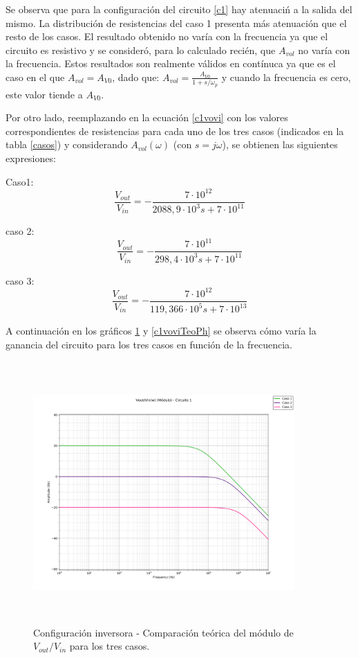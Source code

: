 Se observa que para la configuraci\'on del circuito \ref{c1} hay atenuaci\'n
a la salida del mismo. La distribuci\'on de resistencias del caso 1
presenta m\'as atenuaci\'on que el resto de los casos. El resultado obtenido
no var\'ia con la frecuencia ya que el circuito es resistivo y se consider\'o,
para lo calculado reci\'en, que $A_{vol}$ no var\'ia con la frecuencia. Estos resultados
son realmente v\'alidos en cont\'inuca ya que es el caso en el que $A_{vol}=A_{V0}$,
dado que: $A_{vol} = \frac{A_{V0}}{1+s/\omega_p} $ y cuando la frecuencia es cero,
este valor tiende a $A_{V0}$.


Por otro lado, reemplazando en la ecuaci\'on \ref{c1vovi} con los valores
 correspondientes de resistencias para cada uno de los tres casos
  (indicados en la tabla \ref{casos}) y considerando
   $A_{vol}(\omega)$ (con $s = j\omega$), se obtienen las siguientes expresiones:

Caso1:
\begin{equation}
	\frac{V_{out}}{V_{in}} = - \frac{7\cdot10^{12}}{2088,9 \cdot 10^3 s + 7 \cdot 10^{11}}
	\label{c1c1vovi}
\end{equation}

caso 2:
\begin{equation}
	\frac{V_{out}}{V_{in}} = - \frac{7 \cdot 10^{11}}{298,4 \cdot 10^{3} s +7 \cdot 10^{11}}
	\label{c1c2vovi}
\end{equation}

caso 3:
\begin{equation}
	\frac{V_{out}}{V_{in}} = - \frac{7 \cdot 10^{12}}{119,366 \cdot 10^{5} s +7 \cdot 10^{13}}
	\label{c1c3vovi}
\end{equation}

A continuaci\'on en los gr\'aficos \ref{c1voviTeoMod} y \ref{c1voviTeoPh} se observa c\'omo var\'ia la ganancia del circuito para los tres casos en funci\'on de la frecuencia.

\begin{figure}[H] %
	\centering
	\includegraphics[width=10cm,height=10cm,keepaspectratio]{../EJ1/00GRAFICOS/teoricos/circ1voviw.png}
	\caption{Configuración inversora - Comparaci\'on te\'orica del m\'odulo de $V_{out}/V_{in}$ para los tres casos.}
	\label{c1voviTeoMod}
\end{figure}

